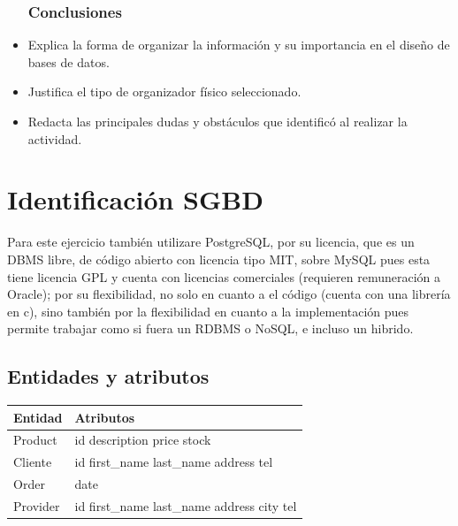 \documentclass[spanish,12pt,letterpapper]{article}
\begin{document}
\begin{itemize}
	\subsubsection{Conclusiones}
	\item Explica la forma de organizar la información y su importancia en el diseño de bases de datos.
	\item Justifica el tipo de organizador físico seleccionado.
	\item Redacta las principales dudas y obstáculos que identificó al realizar la actividad.
	\end{itemize}
	\pagebreak
	
	\section{Identificación SGBD}
	Para este ejercicio también utilizare PostgreSQL, por su licencia, que es un DBMS libre, de código abierto con licencia tipo MIT, sobre MySQL pues esta tiene licencia GPL y cuenta con licencias comerciales (requieren remuneración a Oracle); por su flexibilidad, no solo en cuanto a el código (cuenta con una librería en c), sino también por la flexibilidad en cuanto a la implementación pues permite trabajar como si fuera un RDBMS o NoSQL, e incluso un hibrido.\\
	
	\subsection{Entidades y atributos}
	
		\begin{center}
	\begin{tabular}{| p{4cm} | p{4cm} |}
	\hline
	
	\textbf{Entidad} & \textbf{Atributos}\\
	\hline
	Product & id \linebreak description \linebreak price \linebreak stock\\
	\hline
	Cliente & id \linebreak first\_name \linebreak last\_name \linebreak address \linebreak tel\\
	\hline
	Order & date \\
	\hline
	Provider & id \linebreak first\_name \linebreak last\_name \linebreak address \linebreak city \linebreak tel\\
	\hline	
	\end{tabular}
	\end{center}
	
\end{document}
